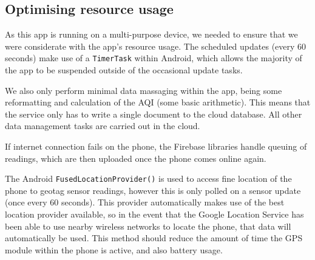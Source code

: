 \documentclass[sigconf, nonacm]{acmart}
\begin{document}
\subsection{Optimising resource usage}

As this app is running on a multi-purpose device, we needed to ensure that we were considerate
with the app's resource usage. The scheduled updates (every 60 seconds) make use of a 
\texttt{TimerTask} within Android, which allows the majority of the app to be suspended
outside of the occasional update tasks.

We also only perform minimal data massaging within the app, being some reformatting and 
calculation of the AQI (some basic arithmetic). This means that the service only has to
write a single document to the cloud database. All other data management tasks are carried
out in the cloud.

If internet connection fails on the phone, the Firebase libraries handle queuing of readings,
which are then uploaded once the phone comes online again.

The Android \texttt{FusedLocationProvider()}\cite{android_fusedlocation} is used to access fine location of the phone
to geotag sensor readings, however this is only polled on a sensor update (once every 60 
seconds). This provider automatically makes use of the best location provider available, so
in the event that the Google Location Service has been able to use nearby wireless networks
to locate the phone, that data will automatically be used. This method should reduce the amount
of time the GPS module within the phone is active, and also battery usage.
\end{document}

